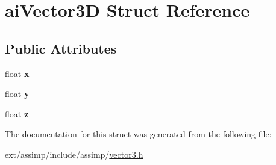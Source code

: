 \hypertarget{structai_vector3_d}{\section{ai\-Vector3\-D Struct Reference}
\label{structai_vector3_d}
}
\subsection*{Public Attributes}
\begin{DoxyCompactItemize}
\item 
\hypertarget{structai_vector3_d_a3762d39eeb99def9ebd413b2bb8dd470}{float {\bfseries x}}\label{structai_vector3_d_a3762d39eeb99def9ebd413b2bb8dd470}

\item 
\hypertarget{structai_vector3_d_ac7b5fcc03324f8c3bc8429c95882dfb8}{float {\bfseries y}}\label{structai_vector3_d_ac7b5fcc03324f8c3bc8429c95882dfb8}

\item 
\hypertarget{structai_vector3_d_a2b93b892064995e8d24f4e3352175aae}{float {\bfseries z}}\label{structai_vector3_d_a2b93b892064995e8d24f4e3352175aae}

\end{DoxyCompactItemize}


The documentation for this struct was generated from the following file\-:\begin{DoxyCompactItemize}
\item 
ext/assimp/include/assimp/\hyperlink{vector3_8h}{vector3.\-h}\end{DoxyCompactItemize}
